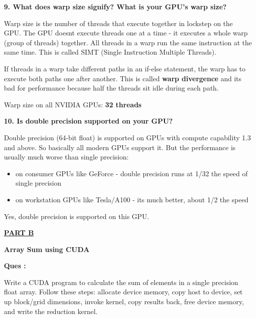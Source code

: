 \documentclass[12pt]{article}
\begin{document}
\vspace{0.5cm}

\textbf{9. What does warp size signify? What is your GPU's warp size?}

\vspace{0.3cm}

Warp size is the number of threads that execute together in lockstep on the GPU. The GPU doesnt execute threads one at a time - it executes a whole warp (group of threads) together. All threads in a warp run the same instruction at the same time. This is called SIMT (Single Instruction Multiple Threads).

If threads in a warp take different paths in an if-else statement, the warp has to execute both paths one after another. This is called \textbf{warp divergence} and its bad for performance because half the threads sit idle during each path.

Warp size on all NVIDIA GPUs: \textbf{32 threads}

\vspace{0.5cm}

\textbf{10. Is double precision supported on your GPU?}

\vspace{0.3cm}

Double precision (64-bit float) is supported on GPUs with compute capability 1.3 and above. So basically all modern GPUs support it. But the performance is usually much worse than single precision:

\begin{itemize}
\item on consumer GPUs like GeForce - double precision runs at 1/32 the speed of single precision
\item on workstation GPUs like Tesla/A100 - its much better, about 1/2 the speed
\end{itemize}

Yes, double precision is supported on this GPU.

\newpage

\noindent
{\Huge\underline{\textbf{PART B}}}

\vspace{0.5cm}

{\Large\textbf{Array Sum using CUDA}}

\vspace{1cm}

\textbf{Ques :}

Write a CUDA program to calculate the sum of elements in a single precision float array. Follow these steps: allocate device memory, copy host to device, set up block/grid dimensions, invoke kernel, copy results back, free device memory, and write the reduction kernel.
\end{document}
